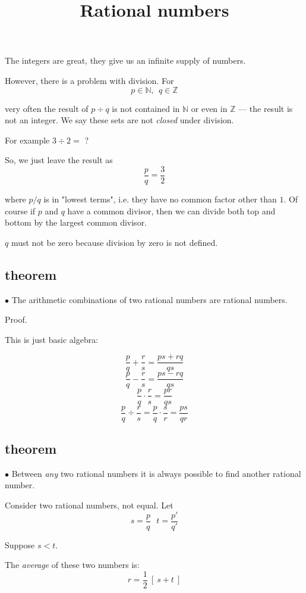\documentclass[11pt, oneside]{article}
\title{Rational numbers}
\date{}
\begin{document}
\maketitle
\Large


The integers are great, they give us an infinite supply of numbers.

However, there is a problem with division.  For
\[ p \in \mathbb{N}, \ \ q \in \mathbb{Z} \]

very often the result of $p  \div q$ is not contained in $\mathbb{N}$ or even in $\mathbb{Z}$ --- the result is not an integer. We say these sets are not \emph{closed} under division.

For example $3 \div 2 =$ ?

So, we just leave the result as 
\[ \frac{p}{q} = \frac{3}{2} \]

where $p/q$ is in "lowest terms", i.e. they have no common factor other than $1$.  Of course if $p$ and $q$ have a common divisor, then we can divide both top and bottom by the largest common divisor.

$q$ must not be zero because division by zero is not defined.

\subsection*{theorem}

$\bullet$  The arithmetic combinations of two rational numbers are rational numbers.

Proof.

This is just basic algebra:

\[  \frac{p}{q} + \frac{r}{s} = \frac{ps + rq}{qs} \]
\[  \frac{p}{q} - \frac{r}{s} = \frac{ps - rq}{qs} \]
\[  \frac{p}{q} \cdot \frac{r}{s} = \frac{pr}{qs} \]
\[  \frac{p}{q} \div \frac{r}{s} = \frac{p}{q} \cdot \frac{s}{r} = \frac{ps}{qr} \]

\subsection*{theorem}

$\bullet$  Between \emph{any} two rational numbers it is always possible to find another rational number.  

Consider two rational numbers, not equal.  Let
\[ s = \frac{p}{q} \ \ \ t = \frac{p'}{q'} \]

Suppose $s < t$.

The \emph{average} of these two numbers is:
\[ r = \frac{1}{2} \ [ \ s + t \ ] \]
\end{document}
